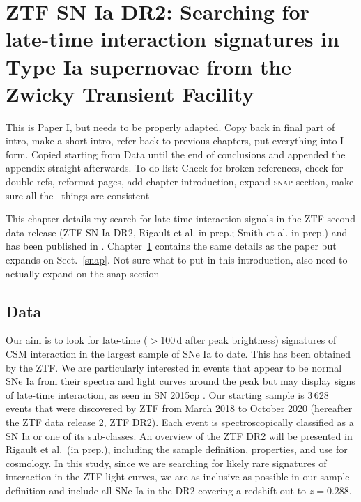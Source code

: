 \documentclass[a4paper,oneside,12pt, class=Latex/Classes/PhDthesisPSnPDF, crop=false]{standalone}
\begin{document}
\doublespacing
\chapter{ZTF SN Ia DR2: Searching for late-time interaction signatures in Type Ia supernovae from the Zwicky Transient Facility}
\label{chap:DR2_search}


\color{red} This is Paper I, but needs to be properly adapted. Copy back in final part of intro, make a short intro, refer back to previous chapters, put everything into I form. Copied starting from Data until the end of conclusions and appended the appendix straight afterwards. To-do list: Check for broken references, check for double refs, reformat pages, add chapter introduction, expand \textsc{snap} section, make sure all the \ztfg\ztfr\ztfi\ things are consistent\color{black}

This chapter details my search for late-time interaction signals in the ZTF second data release (ZTF SN Ia DR2, Rigault et al. in prep.; Smith et al. in prep.) and has been published in \cite{Terwel_2024_paper1}. Chapter~\ref{chap:DR2_search} contains the same details as the paper but expands on Sect.~\ref{snap}. \color{red} Not sure what to put in this introduction, also need to actually expand on the snap section \color{black}


\section{Data}
\label{data}
Our aim is to look for late-time ($>$100\,d after peak brightness) signatures of CSM interaction in the largest sample of SNe Ia to date. This has been obtained by the ZTF. We are particularly interested in events that appear to be normal SNe Ia from their spectra and light curves around the peak but may display signs of late-time interaction, as seen in SN 2015cp \citep{2015cp}. Our starting sample is 3\,628 events that were discovered by ZTF from March 2018 to October 2020 (hereafter the ZTF data release 2, ZTF DR2). Each event is spectroscopically classified as a SN Ia or one of its sub-classes. An overview of the ZTF DR2 will be presented in Rigault et al.~(in prep.), including the sample definition, properties, and use for cosmology. In this study, since we are searching for likely rare signatures of interaction in the ZTF light curves, we are as inclusive as possible in our sample definition and include all SNe Ia in the DR2 covering a redshift out to $z = 0.288$. 
\end{document}
